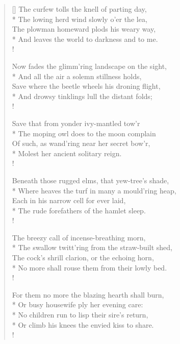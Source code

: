 \documentclass[MAIN]{subfiles}
\begin{document}
\settowidth{\versewidth}{The rose, the shine, the bubble, and the snow,}
\begin{verse}[\versewidth]
The curfew tolls the knell of parting day,\\*
\vin The lowing herd wind slowly o'er the lea,\\
The plowman homeward plods his weary way,\\*
\vin And leaves the world to darkness and to me.\\!

Now fades the glimm'ring landscape on the sight,\\*
And all the air a solemn stillness holds,\\
Save where the beetle wheels his droning flight,\\*
And drowsy tinklings lull the distant folds;\\!

Save that from yonder ivy-mantled tow'r\\*
The moping owl does to the moon complain\\
Of such, as wand'ring near her secret bow'r,\\*
Molest her ancient solitary reign.\\!

Beneath those rugged elms, that yew-tree's shade,\\*
Where heaves the turf in many a mould'ring heap,\\
Each in his narrow cell for ever laid,\\*
The rude forefathers of the hamlet sleep.\\!

The breezy call of incense-breathing morn,\\*
The swallow twitt'ring from the straw-built shed,\\
The cock's shrill clarion, or the echoing horn,\\*
No more shall rouse them from their lowly bed.\\!

For them no more the blazing hearth shall burn,\\*
Or busy housewife ply her evening care:\\*
No children run to lisp their sire's return,\\*
Or climb his knees the envied kiss to share.\\!


\end{verse}
\end{document}

